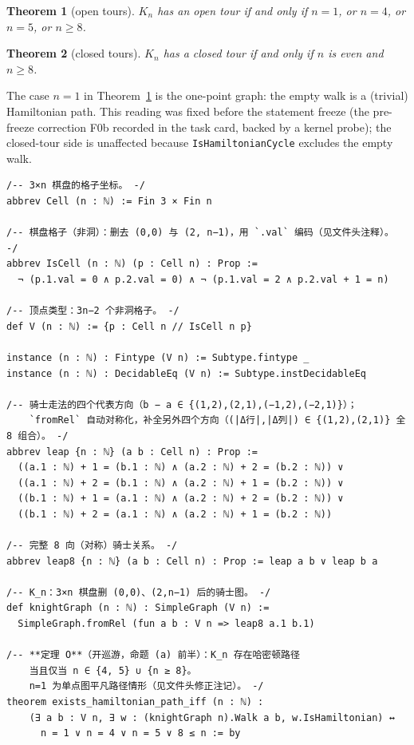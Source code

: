 \documentclass[11pt]{article}
\newtheorem{theorem}{Theorem}
\begin{document}
\begin{theorem}[open tours]\label{thm:open}
$K_n$ has an open tour if and only if $n=1$, or $n=4$, or $n=5$, or
$n\ge 8$.
\end{theorem}

\begin{theorem}[closed tours]\label{thm:closed}
$K_n$ has a closed tour if and only if $n$ is even and $n\ge 8$.
\end{theorem}

The case $n=1$ in Theorem~\ref{thm:open} is the one-point graph: the empty
walk is a (trivial) Hamiltonian path. This reading was fixed before the
statement freeze (the pre-freeze correction F0b recorded in the task card,
backed by a kernel probe); the closed-tour side is unaffected because
\texttt{IsHamiltonianCycle} excludes the empty walk.

\begin{lstlisting}[caption={Frozen statement (verbatim lines 43--76 of the
frozen statement file, sha256 \texttt{96875db4...}): board encoding, the
knight graph, and the head of Theorem~\ref{thm:open}. The proof body
placeholder lies outside the excerpt.},label={lst:stmt-open}]
/-- 3×n 棋盘的格子坐标。 -/
abbrev Cell (n : ℕ) := Fin 3 × Fin n

/-- 棋盘格子（非洞）：删去 (0,0) 与 (2, n−1)，用 `.val` 编码（见文件头注释）。 -/
abbrev IsCell (n : ℕ) (p : Cell n) : Prop :=
  ¬ (p.1.val = 0 ∧ p.2.val = 0) ∧ ¬ (p.1.val = 2 ∧ p.2.val + 1 = n)

/-- 顶点类型：3n−2 个非洞格子。 -/
def V (n : ℕ) := {p : Cell n // IsCell n p}

instance (n : ℕ) : Fintype (V n) := Subtype.fintype _
instance (n : ℕ) : DecidableEq (V n) := Subtype.instDecidableEq

/-- 骑士走法的四个代表方向（b − a ∈ {(1,2),(2,1),(−1,2),(−2,1)}）；
    `fromRel` 自动对称化，补全另外四个方向（(|Δ行|,|Δ列|) ∈ {(1,2),(2,1)} 全 8 组合）。 -/
abbrev leap {n : ℕ} (a b : Cell n) : Prop :=
  ((a.1 : ℕ) + 1 = (b.1 : ℕ) ∧ (a.2 : ℕ) + 2 = (b.2 : ℕ)) ∨
  ((a.1 : ℕ) + 2 = (b.1 : ℕ) ∧ (a.2 : ℕ) + 1 = (b.2 : ℕ)) ∨
  ((b.1 : ℕ) + 1 = (a.1 : ℕ) ∧ (a.2 : ℕ) + 2 = (b.2 : ℕ)) ∨
  ((b.1 : ℕ) + 2 = (a.1 : ℕ) ∧ (a.2 : ℕ) + 1 = (b.2 : ℕ))

/-- 完整 8 向（对称）骑士关系。 -/
abbrev leap8 {n : ℕ} (a b : Cell n) : Prop := leap a b ∨ leap b a

/-- K_n：3×n 棋盘删 (0,0)、(2,n−1) 后的骑士图。 -/
def knightGraph (n : ℕ) : SimpleGraph (V n) :=
  SimpleGraph.fromRel (fun a b : V n => leap8 a.1 b.1)

/-- **定理 O**（开巡游，命题 (a) 前半）：K_n 存在哈密顿路径
    当且仅当 n ∈ {4, 5} ∪ {n ≥ 8}。
    n=1 为单点图平凡路径情形（见文件头修正注记）。 -/
theorem exists_hamiltonian_path_iff (n : ℕ) :
    (∃ a b : V n, ∃ w : (knightGraph n).Walk a b, w.IsHamiltonian) ↔
      n = 1 ∨ n = 4 ∨ n = 5 ∨ 8 ≤ n := by
\end{lstlisting}
\end{document}
